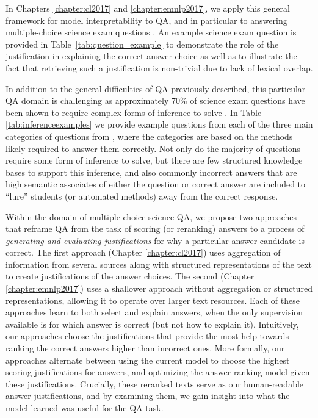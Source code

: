 In Chapters \ref{chapter:cl2017} and \ref{chapter:emnlp2017}, we apply this general framework for model interpretability to QA, and in particular to answering multiple-choice science exam questions \citep{clark:2015}.  An example science exam question is provided in Table~\ref{tab:question_example} to demonstrate the role of the justification in explaining the correct answer choice as well as to illustrate the fact that retrieving such a justification is non-trivial due to lack of lexical overlap. 

In addition to the general difficulties of QA previously described, this particular QA domain is challenging as approximately 70\% of science exam questions have been shown to require complex forms of inference to solve \citep{clark:2013,jansen-EtAl:2016:COLING}.  In Table \ref{tab:inferenceexamples} we provide example questions from each of the three main categories of questions from \citet{clark:2013}, where the categories are based on the methods likely required to answer them correctly.  Not only do the majority of questions require some form of inference to solve, but there are few structured knowledge bases to support this inference, and also commonly incorrect answers that are high semantic associates of either the question or correct answer are included to ``lure'' students (or automated methods) away from the correct response.

Within the domain of multiple-choice science QA, we propose two approaches that reframe QA from the task of scoring (or reranking) answers to a process of \emph{generating and evaluating justifications} for why a particular answer candidate is correct.  The first approach (Chapter \ref{chapter:cl2017}) uses aggregation of information from several sources along with structured representations of the text to create justifications of the answer choices.  The second (Chapter \ref{chapter:emnlp2017}) uses a shallower approach without aggregation or structured representations, allowing it to operate over larger text resources.  Each of these approaches learn to both select and explain answers, when the only supervision available is for which answer is correct (but not how to explain it).
Intuitively, our approaches choose the justifications that provide the most help towards ranking the correct answers higher than incorrect ones.
More formally, our approaches alternate between using the current model to choose the highest scoring justifications for answers, and optimizing the answer ranking model given these justifications. 
Crucially, these reranked texts serve as our human-readable answer justifications, and by examining them, we gain insight into what the model learned was useful for the QA task. 


